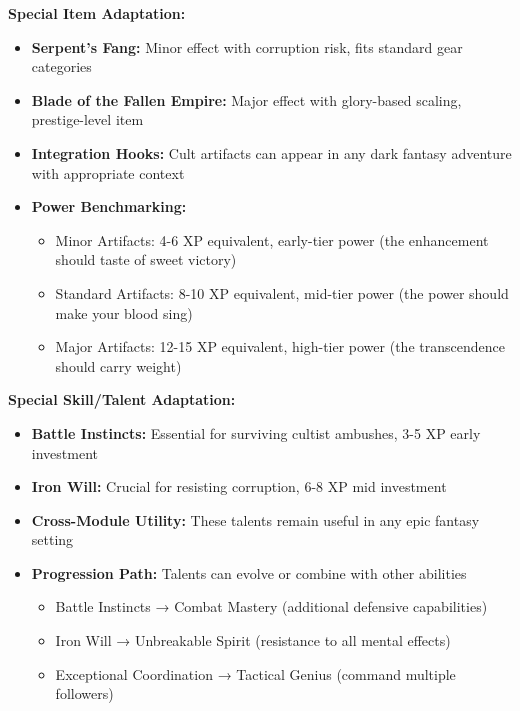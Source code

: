 \documentclass[11pt]{article}
\begin{document}
\begin{itemize}
\begin{itemize}
\begin{itemize}
\textbf{Special Item Adaptation:}
\begin{itemize}
\item \textbf{Serpent's Fang:} Minor effect with corruption risk, fits standard gear categories
\item \textbf{Blade of the Fallen Empire:} Major effect with glory-based scaling, prestige-level item
\item \textbf{Integration Hooks:} Cult artifacts can appear in any dark fantasy adventure with appropriate context
\item \textbf{Power Benchmarking:} 
  \begin{itemize}
  \item Minor Artifacts: 4-6 XP equivalent, early-tier power (the enhancement should taste of sweet victory)
  \item Standard Artifacts: 8-10 XP equivalent, mid-tier power (the power should make your blood sing)
  \item Major Artifacts: 12-15 XP equivalent, high-tier power (the transcendence should carry weight)
  \end{itemize}
\end{itemize}

\textbf{Special Skill/Talent Adaptation:}
\begin{itemize}
\item \textbf{Battle Instincts:} Essential for surviving cultist ambushes, 3-5 XP early investment
\item \textbf{Iron Will:} Crucial for resisting corruption, 6-8 XP mid investment
\item \textbf{Cross-Module Utility:} These talents remain useful in any epic fantasy setting
\item \textbf{Progression Path:} Talents can evolve or combine with other abilities
  \begin{itemize}
  \item Battle Instincts → Combat Mastery (additional defensive capabilities)
  \item Iron Will → Unbreakable Spirit (resistance to all mental effects)
  \item Exceptional Coordination → Tactical Genius (command multiple followers)
  \end{itemize}
\end{itemize}


\end{itemize}
\end{itemize}
\end{itemize}
\end{document}
